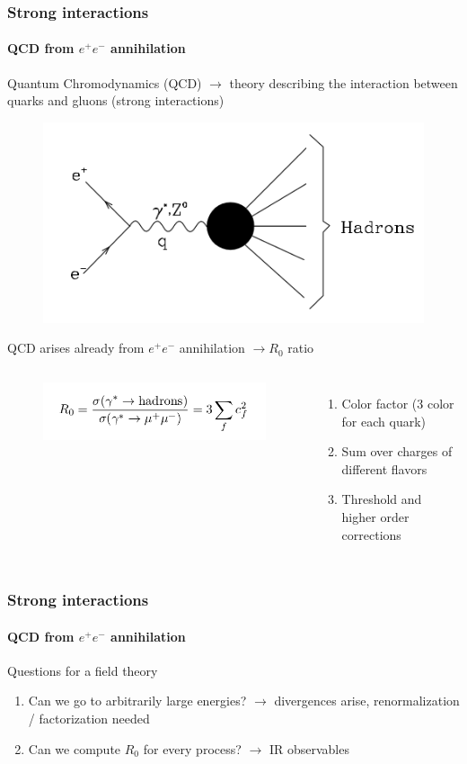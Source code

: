 \documentclass[aspectratio=43]{beamer}
\begin{document}
\begin{frame}

	\frametitle{Strong interactions}
	\framesubtitle{QCD from $e^{+}e^{-}$ annihilation}

	Quantum Chromodynamics (QCD) $\rightarrow$ theory describing the interaction between quarks and gluons (strong interactions)
	\begin{figure}
		\includegraphics[width = 5 cm]{plots/ee_hadrons.png}
	\end{figure}
 
	QCD arises already from $e^{+}e^{-}$ annihilation $\rightarrow R_{0}$ ratio

	\begin{columns}
	
	
		\begin{figure}
			\includegraphics[width = 6 cm]{plots/eq_R0.png}
		\end{figure}
	
	
		\begin{enumerate}
			\item \footnotesize Color factor (3 color for each quark)
			\item \footnotesize Sum over charges of different flavors
			\item \footnotesize Threshold and higher order corrections
		\end{enumerate}	

	\end{columns}

\end{frame}

\begin{frame}
	
	\frametitle{Strong interactions}
	\framesubtitle{QCD from $e^{+}e^{-}$ annihilation}
	
	Questions for a field theory
	
	\vspace{0.3cm}
	
	\begin{enumerate}
		\item Can we go to arbitrarily large energies? $\rightarrow$ divergences arise, renormalization / factorization needed
		\item Can we compute $R_{0}$ for every process? $\rightarrow$ IR observables
	\end{enumerate}	

\end{frame}
\end{document}
